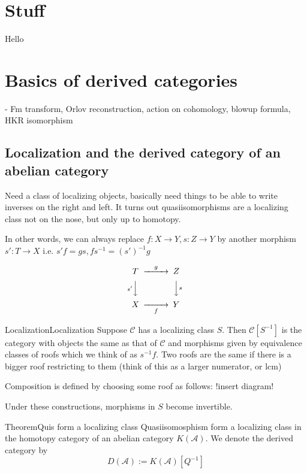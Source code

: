 \section{Stuff}
Hello

\section{Basics of derived categories}
 - Fm transform, Orlov reconstruction, action on cohomology, blowup formula, HKR isomorphism

\subsection{Localization and the derived category of an abelian category}

Need a class of localizing objects, basically need things to be able to write inverses on the right and left. It turns out quasiisomorphisms are a localizing class not on the nose, but only up to homotopy.

In other words, we can always replace $f:X\rightarrow Y, s:Z\rightarrow Y$ by another morphism $s':T\rightarrow X$ i.e.  $s'f=gs,fs^{-1}=(s')^{-1}g$

$$\begin{CD} T @>g>> Z \\ @Vs'VV @VVsV \\ X @> >f > Y\end{CD}$$

\begin{definition}{Localization}{Localization}
    Suppose $\mathcal{C}$ has a localizing class $S$. Then $\mathcal{C}[S^{-1}]$ is the category with objects the same as that of $\mathcal{C}$ and morphisms given by equivalence classes of roofs which we think of as $s^{-1}f$. Two roofs are the same if there is a bigger roof restricting to them (think of this as a larger numerator, or lcm)
\end{definition}

Composition is defined by choosing some roof as follows: !insert diagram!
 
Under these constructions, morphisms in $S$ become invertible. 

\begin{theorem}{Theorem}{Quis form a localizing class}
    Quasiisomosphism form a localizing class in the homotopy category of an abelian category $K(\mathcal{A})$. We denote the derived category by$$D(\mathcal{A}):=K(\mathcal{A})[Q^{-1}]$$
\end{theorem}

